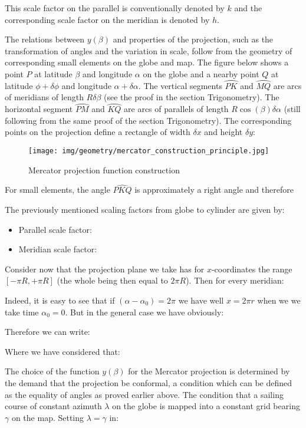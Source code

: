 	This scale factor on the parallel is conventionally denoted by $k$ and the corresponding scale factor on the meridian is denoted by $h$.
	
	The relations between $y(\beta)$ and properties of the projection, such as the transformation of angles and the variation in scale, follow from the geometry of corresponding small elements on the globe and map. The figure below shows a point $P$ at latitude $\beta$ and longitude $\alpha$ on the globe and a nearby point $Q$ at latitude $\phi + \delta \phi$ and longitude $\alpha + \delta \alpha$. The vertical segments $\wideparen{PK}$ and $\wideparen{MQ}$ are arcs of meridians of length $R\delta \beta$ (see the proof in the section Trigonometry). The horizontal segment $\wideparen{PM}$ and $\wideparen{KQ}$ are arcs of parallels of length $R\cos(\beta)\delta\alpha$ (still following from the same proof of the section Trigonometry). The corresponding points on the projection define a rectangle of width $\delta x$ and height $\delta y$:
	\begin{figure}[H]
		\centering
		\texttt{[image: img/geometry/mercator\_construction\_principle.jpg]}
		\caption{Mercator projection function construction}
	\end{figure}
	For small elements, the angle $\widehat{PKQ}$ is approximately a right angle and therefore
	
	The previously mentioned scaling factors from globe to cylinder are given by:
	\begin{itemize}
		\item Parallel scale factor: 
		 

		\item Meridian scale factor:
		 
	\end{itemize}
	Consider now that the projection plane we take has for $x$-coordinates the range $[-\pi R,+\pi R]$ (the whole being then equal to $2\pi R$). Then for every meridian:
	 
	Indeed, it is easy to see that if $(\alpha-\alpha_0)=2\pi$ we have well $x=2\pi r$ when we we take time $\alpha_0=0$. But in the general case we have obviously:
	 
	Therefore we can write:
	
	Where we have considered that:
	
	The choice of the function $y(\beta)$ for the Mercator projection is determined by the demand that the projection be conformal, a condition which can be defined as the equality of angles as proved earlier above. The condition that a sailing course of constant azimuth $\lambda$ on the globe is mapped into a constant grid bearing $\gamma$ on the map. Setting $\lambda = \gamma$ in:
	
